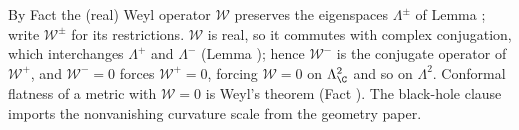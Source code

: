 By Fact  the (real) Weyl operator $\mathcal{W}$ preserves the eigenspaces $\Lambda^\pm$ of Lemma ; write $\mathcal{W}^\pm$ for its restrictions. $\mathcal{W}$ is real, so it commutes with complex conjugation, which interchanges $\Lambda^+$ and $\Lambda^-$ (Lemma ); hence $\mathcal{W}^-$ is the conjugate operator of $\mathcal{W}^+$, and $\mathcal{W}^- = 0$ forces $\mathcal{W}^+ = 0$, forcing $\mathcal{W} = 0$ on $\Lambda^2_\C$ and so on $\Lambda^2$. Conformal flatness of a metric with $\mathcal{W} = 0$ is Weyl's theorem (Fact ). The black-hole clause imports the nonvanishing curvature scale from the geometry paper.
